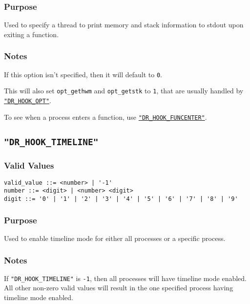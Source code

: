 \subsubsection{Purpose}
\vspace{-2ex}
Used to specify a thread to print memory and stack information to stdout upon exiting a function.

\vspace{-2ex}
\subsubsection{Notes}
\vspace{-2ex}
If this option isn't specified, then it will default to \verb|0|.

This will also set \texttt{opt\_gethwm} and \texttt{opt\_getstk} to \verb|1|, that are usually handled by \hyperref[section:flags:DR_HOOK_OPT]{\texttt{"DR\_HOOK\_OPT"}}.

To see when a process enters a function, use \hyperref[section:flags:DR_HOOK_FUNCENTER]{\texttt{"DR\_HOOK\_FUNCENTER"}}.



\subsection{\texttt{"DR\_HOOK\_TIMELINE"}}
\label{section:flags:DR_HOOK_TIMELINE}
\vspace{-2ex}
\subsubsection{Valid Values}
\vspace{-2ex}
\verb+valid_value ::= <number> | '-1'+ \\
\verb+number ::= <digit> | <number> <digit>+ \\
\verb+digit ::= '0' | '1' | '2' | '3' | '4' | '5' | '6' | '7' | '8' | '9'+

\vspace{-2ex}
\subsubsection{Purpose}
\vspace{-2ex}
Used to enable timeline mode for either all processes or a specific process.

\vspace{-2ex}
\subsubsection{Notes}
\vspace{-2ex}
If \texttt{"DR\_HOOK\_TIMELINE"} is \verb|-1|, then all processes will have timeline mode enabled. All other non-zero valid values will result in the one specified process having timeline mode enabled.

